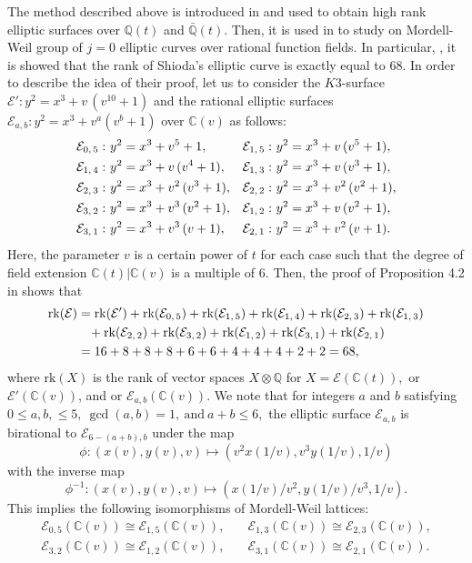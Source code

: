 \documentclass[11pt]{amsart}
\newcommand{\Q}{{\mathbb Q}}
\newcommand{\CC}{{\mathbb C}}
\newcommand{\Ee}{{\mathcal E}}
\newcommand{\rk}{{\text{rk}}}
\numberwithin{equation}{section}
\numberwithin{table}{section}
\newcommand\<{\langle}
\begin{document}
The method described 	above  is introduced in \cite{meijer}  and used to obtain high rank elliptic surfaces over $\Q(t) $ and $\bar{\Q}(t)$. 
Then, it is  used in \cites{Chahal2000, meijer} to study on Mordell-Weil group of $j=0$ elliptic curves over rational function fields. In particular, \cite{Chahal2000}, it is showed that the rank of Shioda's elliptic curve is exactly equal to $68$. 
In order to describe  the  idea of their proof, let us to consider the $K3$-surface $\Ee': y^2= x^3 + v\,(v^{10} + 1)$   and  
the rational elliptic surfaces $\Ee_{a, b}: y^2= x^3 + v^a (v^b+1)$ over $\CC(v)$ as follows:
\begin{align}
		\Ee_{0,\, 5}:\ &  y^2= x^3 + v^5 + 1,  &  
		\Ee_{1,\, 5}:\ &  y^2= x^3 + v\,(v^5 + 1), \notag \\
		\Ee_{1,\, 4}:\ &  y^2= x^3 + v\,(v^4 + 1),  &  
		\Ee_{1,\, 3}:\ &  y^2= x^3 + v\,(v^3+1),   \notag \\
		\Ee_{2,\, 3}:\ &  y^2= x^3 + v^2\,(v^3+1), &
		\Ee_{2,\, 2}:\ &  y^2= x^3 + v^2\,(v^2+1),  \notag \\
		\Ee_{3,\, 2}:\ &  y^2= x^3 + v^3\,(v^2+1),  &
		\Ee_{1,\, 2}:\ &  y^2= x^3 + v \,(v^2+1),\notag \\
		\Ee_{3,\, 1}:\ &  y^2= x^3 + v^3\,(v+1),  &
		\Ee_{2,\, 1}:\ &  y^2= x^3 + v^2\,(v+1). 	\label{rak1}
\end{align}
Here, the parameter $v$ is a certain power of $t$ for each case such that the
degree of field extension $\CC(t) | \CC(v)$ is a multiple  of $6$. 
Then,   the  proof of Proposition 4.2 in \cite{Chahal2000} shows that
%
\begin{align}
		\rk (\Ee ) & =   \rk (\Ee')+\rk (\Ee_{0,\, 5}) + \rk (\Ee_{1,\, 5}) +\rk (\Ee_{1,\, 4})+\rk (\Ee_{2,\, 3})+\rk (\Ee_{1,\, 3}) \notag \\ 
		& \hspace{0.3cm }+ \rk (\Ee_{2,\, 2}) + \rk (\Ee_{3,\, 2})+ \rk (\Ee_{1,\, 2}) +\rk (\Ee_{3,\, 1})+ \rk (\Ee_{2,\, 1}) \notag \\ &=16+8 + 8 + 8 + 6 + 6 + 4 + 4 + 4 + 2 + 2=68, 	\label{rak2}
\end{align}
%
where $\rk (X)$ is the rank of vector spaces $X \otimes \Q$  for 
$X= \Ee (\CC(t)),$ or $\Ee'(\CC(v))$, and  or $\Ee_{a, b}(\CC(v))$.
We note that for  integers $a$ and $b$ satisfying
$0 \leq a, b, \leq 5, \ \gcd(a,b)=1, \ \text{and}\  a+b \leq 6, $
 the elliptic 
surface $ \Ee_{a, b}$   is birational to $\Ee_{6-(a+b), b}$   under the map
$$\phi:   (x(v), y(v), v) \mapsto \left( v^2 x(1/v) , v^3 y(1/v), 1/v \right)$$  with the  inverse map 
$$\phi^{-1}:   (x(v), y(v), v) \mapsto \left( x(1/v)/v^2  , y(1/v)/v^3, 1/v \right).$$
This implies the following isomorphisms of Mordell-Weil lattices:
\begin{align*}
	\Ee_{0, 5}(\CC(v))  \cong  \Ee_{1, 5}(\CC(v)),\quad & \Ee_{1, 3}(\CC(v)) \cong \Ee_{2,3}(\CC(v)),\\
	\Ee_{3, 2}(\CC(v))  \cong \Ee_{1, 2}(\CC(v)),\quad &  \Ee_{3, 1}(\CC(v))  \cong \Ee_{2, 1}(\CC(v)). 
\end{align*}
\end{document}
